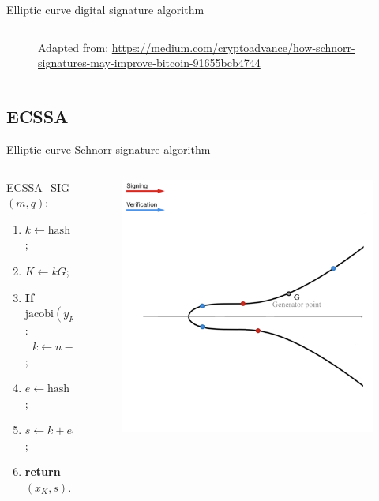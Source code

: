 \documentclass[slidescentered]{beamer}
\newcommand{\source}[1]{\caption*{\tiny Adapted from: {#1}} }
\begin{document}
\begin{frame}{Elliptic curve digital signature algorithm}
\begin{columns}
\begin{column}{0.5\linewidth}
\begin{figure}
{						\source{\tiny \url{https://medium.com/cryptoadvance/how-schnorr-signatures-may-improve-bitcoin-91655bcb4744}}}
				\end{figure}
			\end{column}
		\end{columns}
	\end{frame}
	
	\subsection{ECSSA}
	\begin{frame}{Elliptic curve Schnorr signature algorithm}
		\begin{columns}
			\begin{column}{0.6\linewidth}
				ECSSA\_SIG$(m, q)$:
				\begin{enumerate}
					\item<3 -> $k \gets \text{hash}(q \ || \ m) \ (\text{mod} \ n)$;
					\item<4 -> $K \gets kG$;
					\item<5 -> \textbf{If} $\text{jacobi}(y_K) \neq 1$: \\$\ \ \ k \gets n - k$;
					\item<6 -> $e \gets \text{hash}(x_K || qG || m) \ (\text{mod} \ n)$;
					\item<7 -> $s \gets k + eq \ (\text{mod} \ n)$;
					\item<8 -> \textbf{return} $(x_K, s)$.
				\end{enumerate}
			\end{column}
			\begin{column}{0.5\linewidth}
				\begin{figure}
					 {\vspace*{-0.7cm}
						\hspace*{-0.9cm}
						\includegraphics[scale=0.28]{images/Schnorr1}
}
\end{figure}
\end{column}
\end{columns}
\end{frame}
\end{document}
